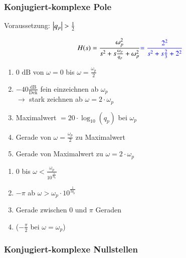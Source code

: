 \subsubsection{Konjugiert-komplexe Pole}

\begin{minipage}[t]{0.48\columnwidth}
    \raggedright
    \begin{center}
        Voraussetzung: $\left|q_p\right| > \frac{1}{2}$
    \end{center}
    $$ H(s) = \frac{\omega_p^2}{s^2 + s \frac{\omega_p}{q_p} + \omega_p^2} {\color{blue}= \frac{2^2}{s^2 + s \frac{2}{3} + 2^2}} $$

    
\end{minipage}
\hfill
\begin{minipage}[t]{0.48\columnwidth}
        \begin{enumerate}
            \item 0 $\text{dB}$ von $\omega=0$ bis $\omega=\frac{\omega_p}{2}$
            \item $-40\frac{\text{dB}}{\text{Dek}}$ fein einzeichnen ab $\omega_p$\\
            $\rightarrow$ stark zeichnen ab $\omega = 2 \cdot \omega_p$
            \item Maximalwert $= 20\cdot \log_{10}(q_p)$ bei $\omega_p$
            \item Gerade von $\omega=\frac{\omega_p}{2}$ zu Maximalwert 
            \item Gerade von Maximalwert zu $\omega = 2 \cdot \omega_p$
        \end{enumerate}
        \begin{enumerate}
            \item 0 bis $\omega < \frac{\omega_p}{10^{\frac{1}{2 q_p}}}$
            \item $- \pi$ ab $\omega > \omega_p \cdot 10^{\frac{1}{2 q_p}}$
            \item Gerade zwischen $0$ und $\pi$ Geraden
            \item ($- \frac{\pi}{2}$ bei $\omega = \omega_p$)
        \end{enumerate}
\end{minipage}


\subsubsection{Konjugiert-komplexe Nullstellen} 

